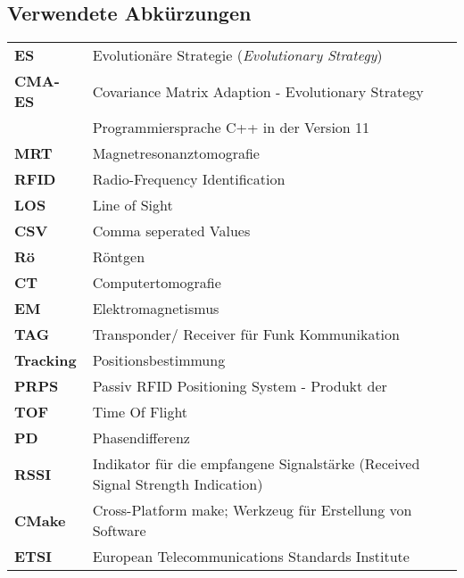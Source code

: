 \newpage
%
\subsection*{Verwendete Abkürzungen}
%
\begin{table} [H]
	\begin{center}
		\begin{tabular}{p{25mm}p{95mm}}
		      	\textbf{ES} & Evolutionäre Strategie (\textit{Evolutionary Strategy})\\
		      	\textbf{CMA-ES}  & Covariance Matrix Adaption - Evolutionary Strategy\\
		      	\textbf{\cpp11} & Programmiersprache C++ in der Version 11\\
		      	\textbf{MRT}	& Magnetresonanztomografie\\
		      	\textbf{RFID} & Radio-Frequency Identification\\
		      	\textbf{LOS} & Line of Sight\\
		      	\textbf{CSV} & Comma seperated Values\\
		      	\textbf{Rö} & Röntgen\\
		      	\textbf{CT} & Computertomografie\\
		      	\textbf{EM} & Elektromagnetismus\\
		      	\textbf{TAG} & Transponder/ Receiver für Funk Kommunikation\\
		      	\textbf{Tracking} & Positionsbestimmung\\
		      	\textbf{PRPS} & Passiv RFID Positioning System - Produkt der \amedogmbh \\
		      	\textbf{TOF} & Time Of Flight\\
		      	\textbf{PD} & Phasendifferenz\\
		      	\textbf{RSSI} & Indikator für die empfangene Signalstärke (Received Signal Strength Indication)\\
		      	\textbf{CMake} & Cross-Platform make; Werkzeug für Erstellung von Software\\
		      	\textbf{ETSI} & European Telecommunications Standards Institute
%		      	
		\end{tabular}
	\end{center}
\end{table}


